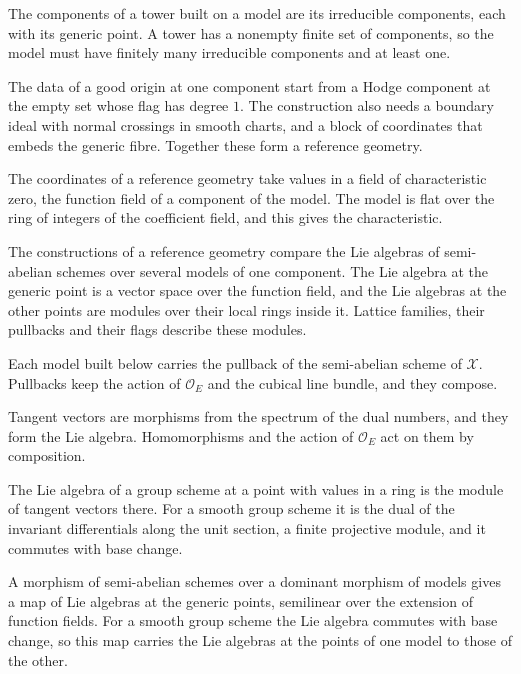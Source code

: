The components of a tower built on a model are its irreducible components, each with its generic
point. A tower has a nonempty finite set of components, so the model must have finitely many
irreducible components and at least one.

The data of a good origin at one component start from a Hodge component at the empty set whose flag has
degree $1$. The construction also needs a boundary ideal with normal crossings in smooth charts, and a block of
coordinates that embeds the generic fibre. Together these form a reference geometry.

The coordinates of a reference geometry take values in a field of characteristic zero, the function field of a
component of the model. The model is flat over the ring of integers of the coefficient field, and this gives the
characteristic.

The constructions of a reference geometry compare the Lie algebras of semi-abelian schemes over several models of one
component. The Lie algebra at the generic point is a vector space over the function field, and the Lie algebras at the
other points are modules over their local rings inside it. Lattice families, their pullbacks and their flags describe these
modules.

Each model built below carries the pullback of the semi-abelian scheme of $\mathcal X$. Pullbacks keep the action of
$\mathcal O_E$ and the cubical line bundle, and they compose.

Tangent vectors are morphisms from the spectrum of the dual numbers, and they form the Lie algebra. Homomorphisms and the
action of $\mathcal O_E$ act on them by composition.

The Lie algebra of a group scheme at a point with values in a ring is the module of tangent vectors there. For a smooth group
scheme it is the dual of the invariant differentials along the unit section, a finite projective module, and it commutes with
base change.

A morphism of semi-abelian schemes over a dominant morphism of models gives a map of Lie algebras at the generic points,
semilinear over the extension of function fields. For a smooth group scheme the Lie algebra commutes with base change, so this
map carries the Lie algebras at the points of one model to those of the other.

